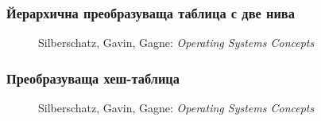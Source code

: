 \documentclass[ignorenonframetext, hyperref=unicode]{beamer}
\begin{document}
\begin{frame}
\frametitle{Йерархична преобразуваща таблица с две нива}
\begin{figure}[h]
\center
{}
\caption{Silberschatz, Gavin, Gagne: {\em Operating Systems Concepts}}
\end{figure}
\end{frame}

\begin{frame}
\frametitle{Преобразуваща хеш-таблица}
\begin{figure}[h]
\center
{}
\caption{Silberschatz, Gavin, Gagne: {\em Operating Systems Concepts}}
\end{figure}
\end{frame}
\end{document}
